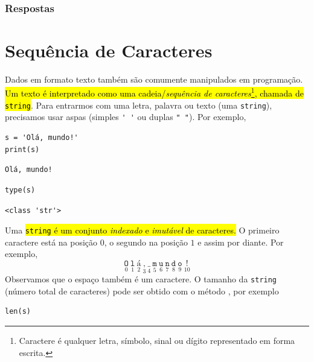 \subsubsection{Respostas}
\shipoutAnswer
\fi

\section{Sequência de Caracteres}\label{cap_lingua_sec_string}

Dados em formato texto também são comumente manipulados em programação. \hl{Um texto é interpretado como uma cadeia/\emph{sequência de caracteres}\footnote{Caractere é qualquer letra, símbolo, sinal ou dígito representado em forma escrita.}, chamada de \texttt{string}}. Para entrarmos com uma letra, palavra ou texto (uma \texttt{string}), precisamos usar aspas (simples \lstinline+' '+ ou duplas \lstinline+" "+). Por exemplo,

\begin{lstlisting}
s = 'Olá, mundo!'
print(s)
\end{lstlisting}

\begin{verbatim}
Olá, mundo!  
\end{verbatim}

\begin{lstlisting}
type(s)
\end{lstlisting}

\begin{verbatim}
<class 'str'>
\end{verbatim}

Uma \hl{\texttt{string} é um conjunto \emph{indexado} e \emph{imutável} de caracteres.} O primeiro caractere está na posição $0$, o segundo na posição $1$ e assim por diante. Por exemplo,
\begin{equation}
  \underset{0}{\texttt{O}}~\underset{1}{\texttt{l}}~\underset{2}{\texttt{á}}~\underset{3}{\texttt{,}}~\underset{4}{\texttt{\_}}~\underset{5}{\texttt{m}}~\underset{6}{\texttt{u}}~\underset{7}{\texttt{n}}~\underset{8}{\texttt{d}}~\underset{9}{\texttt{o}}~\underset{10}{\texttt{!}}
\end{equation}
Observamos que o espaço também é um caractere. O tamanho da \texttt{string} (número total de caracteres) pode ser obtido com o método {\PYTHONlen}, por exemplo

\begin{lstlisting}
len(s)
\end{lstlisting}

